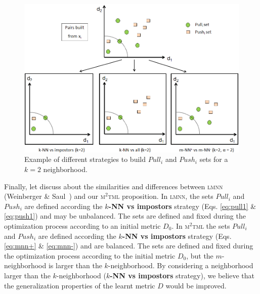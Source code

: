 \begin{figure}[h!]
	\centering
	\includegraphics[width=1\linewidth]{images/Strategy_neighborhood}
	\caption{Example of different strategies to build $Pull_i$ and $Push_i$ sets for a $k=2$ neighborhood.}
	\label{fig:Strategy_neighborhood}
\end{figure}

Finally, let discuss about the similarities and differences between \textsc{lmnn} (Weinberger \& Saul~\cite{Weinberger2009}) and our \textsc{m$^2$tml} proposition. In \textsc{lmnn}, the sets $Pull_i$ and $Push_i$ are defined according the \textbf{$k$-NN vs impostors} strategy (Eqs. \ref{eq:pull1} \& \ref{eq:push1}) and may be unbalanced. The sets are defined and fixed during the optimization process according to an initial metric $D_0$. In \textsc{m$^2$tml} the sets $Pull_i$ and $Push_i$ are defined according the \textbf{$k$-NN vs impostors} strategy (Eqs. \ref{eq:mnn+} \& \ref{eq:mnn-}) and are balanced. The sets are defined and fixed during the optimization process according to the initial metric $D_0$, but the $m$-neighborhood is larger than the $k$-neighborhood. By considering a neighborhood larger than the $k$-neighborhood (\textbf{$k$-NN vs impostors} strategy), we believe that the generalization properties of the learnt metric $D$ would be improved. 

